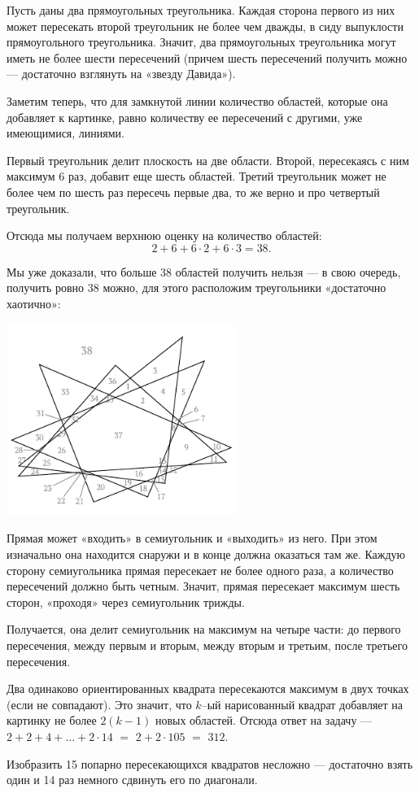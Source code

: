 ﻿
\begin{itemize}

\itA Пусть даны два прямоугольных треугольника. Каждая сторона первого из них может пересекать второй треугольник не более чем дважды, в сиду выпуклости прямоугольного треугольника. Значит, два прямоугольных треугольника могут иметь не более шести пересечений (причем шесть пересечений получить можно — достаточно взглянуть на «звезду Давида»).

Заметим теперь, что для замкнутой линии количество областей, которые она добавляет к картинке, равно количеству ее пересечений с другими, уже имеющимися, линиями.

Первый треугольник делит плоскость на две области. Второй, пересекаясь с ним максимум 6 раз, добавит еще шесть областей. Третий треугольник может не более чем по шесть раз пересечь первые два, то же верно и про четвертый треугольник.

Отсюда мы получаем верхнюю оценку на количество областей:
$$2 + 6 + 6 \cdot 2 + 6 \cdot 3 = 38.$$

Мы уже доказали, что больше 38 областей получить нельзя — в свою очередь, получить ровно 38 можно, для этого расположим треугольники «достаточно хаотично»:

\begin{center}
	\includegraphics[width=7.5cm]{figures/2017-5-1a}
\end{center}

\itB Прямая может «входить» в семиугольник и «выходить» из него. При этом изначально она находится снаружи и в конце должна оказаться там же. Каждую сторону семиугольника прямая пересекает не более одного раза, а количество пересечений должно быть четным. Значит, прямая пересекает максимум шесть сторон, «проходя» через семиугольник трижды.

Получается, она делит семиугольник на максимум на четыре части: до первого пересечения, между первым и вторым, между вторым и третьим, после третьего пересечения.

\itC Два одинаково ориентированных квадрата пересекаются максимум в двух точках (если не совпадают). Это значит, что $k$--ый нарисованный квадрат добавляет на картинку не более $2(k-1)$ новых областей. Отсюда ответ на задачу — $2+2+4+\ldots+2\cdot 14$ $=$ $2+2\cdot105$ $=$ $312$.

Изобразить 15 попарно пересекающихся квадратов несложно — достаточно взять один и 14 раз немного сдвинуть его по диагонали.
\end{itemize}